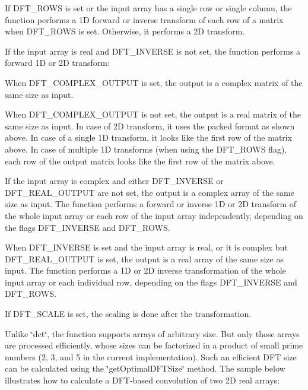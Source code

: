 \begin{DoxyItemize}
\item If {\ttfamily D\+F\+T\+\_\+\+R\+O\+WS} is set or the input array has a single row or single column, the function performs a 1D forward or inverse transform of each row of a matrix when {\ttfamily D\+F\+T\+\_\+\+R\+O\+WS} is set. Otherwise, it performs a 2D transform. 
\item If the input array is real and {\ttfamily D\+F\+T\+\_\+\+I\+N\+V\+E\+R\+SE} is not set, the function performs a forward 1D or 2D transform\+: 
\item When {\ttfamily D\+F\+T\+\_\+\+C\+O\+M\+P\+L\+E\+X\+\_\+\+O\+U\+T\+P\+UT} is set, the output is a complex matrix of the same size as input. 
\item When {\ttfamily D\+F\+T\+\_\+\+C\+O\+M\+P\+L\+E\+X\+\_\+\+O\+U\+T\+P\+UT} is not set, the output is a real matrix of the same size as input. In case of 2D transform, it uses the packed format as shown above. In case of a single 1D transform, it looks like the first row of the matrix above. In case of multiple 1D transforms (when using the {\ttfamily D\+F\+T\+\_\+\+R\+O\+WS} flag), each row of the output matrix looks like the first row of the matrix above. 
\item If the input array is complex and either {\ttfamily D\+F\+T\+\_\+\+I\+N\+V\+E\+R\+SE} or {\ttfamily D\+F\+T\+\_\+\+R\+E\+A\+L\+\_\+\+O\+U\+T\+P\+UT} are not set, the output is a complex array of the same size as input. The function performs a forward or inverse 1D or 2D transform of the whole input array or each row of the input array independently, depending on the flags {\ttfamily D\+F\+T\+\_\+\+I\+N\+V\+E\+R\+SE} and {\ttfamily D\+F\+T\+\_\+\+R\+O\+WS}. 
\item When {\ttfamily D\+F\+T\+\_\+\+I\+N\+V\+E\+R\+SE} is set and the input array is real, or it is complex but {\ttfamily D\+F\+T\+\_\+\+R\+E\+A\+L\+\_\+\+O\+U\+T\+P\+UT} is set, the output is a real array of the same size as input. The function performs a 1D or 2D inverse transformation of the whole input array or each individual row, depending on the flags {\ttfamily D\+F\+T\+\_\+\+I\+N\+V\+E\+R\+SE} and {\ttfamily D\+F\+T\+\_\+\+R\+O\+WS}. 
\end{DoxyItemize}

If {\ttfamily D\+F\+T\+\_\+\+S\+C\+A\+LE} is set, the scaling is done after the transformation.

Unlike \char`\"{}dct\char`\"{}, the function supports arrays of arbitrary size. But only those arrays are processed efficiently, whose sizes can be factorized in a product of small prime numbers (2, 3, and 5 in the current implementation). Such an efficient D\+FT size can be calculated using the \char`\"{}get\+Optimal\+D\+F\+T\+Size\char`\"{} method. The sample below illustrates how to calculate a D\+F\+T-\/based convolution of two 2D real arrays\+: {\ttfamily }

